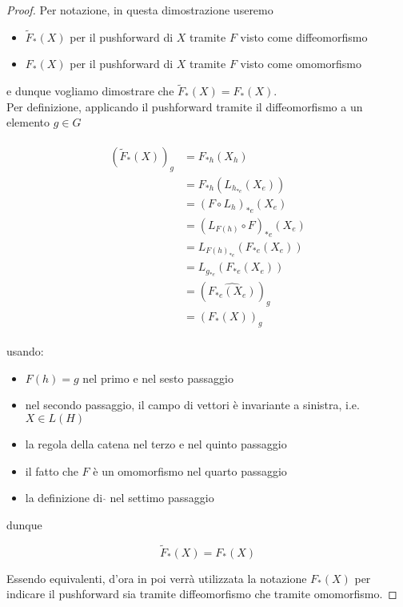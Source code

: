\begin{proof}
	Per notazione, in questa dimostrazione useremo
	
	\begin{itemize}
		\item $ \tilde{F}_{*}(X) $ per il pushforward di $ X $ tramite $ F $ visto come diffeomorfismo
		
		\item $ F_{*}(X) $ per il pushforward di $ X $ tramite $ F $ visto come omomorfismo
	\end{itemize}

	e dunque vogliamo dimostrare che $ \tilde{F}_{*}(X) = F_{*}(X) $.\\
	Per definizione, applicando il pushforward tramite il diffeomorfismo a un elemento $ g \in G $
	
	\begin{align}
		\begin{split}
			(\tilde{F}_{*}(X))_{g} &= F_{*h}(X_{h})\\
			&= F_{*h}(L_{h_{*e}}(X_{e}))\\
			&= (F \circ L_{h})_{*e} (X_{e})\\
			&= (L_{F(h)} \circ F)_{*e} (X_{e})\\
			&= L_{F(h)_{*e}} (F_{*e}(X_{e}))\\
			&= L_{g_{*e}} (F_{*e}(X_{e}))\\
			&= (\widehat{ F_{*e}(X_{e}) })_{g}\\
			&= (F_{*}(X))_{g}
		\end{split}
	\end{align}

	usando:
	
	\begin{itemize}
		\item $ F(h) = g $ nel primo e nel sesto passaggio
		
		\item nel secondo passaggio, il campo di vettori è invariante a sinistra, i.e. $ X \in L(H) $
		
		\item la regola della catena nel terzo e nel quinto passaggio
		
		\item il fatto che $ F $ è un omomorfismo nel quarto passaggio
		
		\item la definizione di $ \hat{} $ nel settimo passaggio
	\end{itemize}

	dunque
	
	\begin{equation}
		\tilde{F}_{*}(X) = F_{*}(X)
	\end{equation}

	Essendo equivalenti, d'ora in poi verrà utilizzata la notazione $ F_{*}(X) $ per indicare il pushforward sia tramite diffeomorfismo che tramite omomorfismo.
\end{proof}


